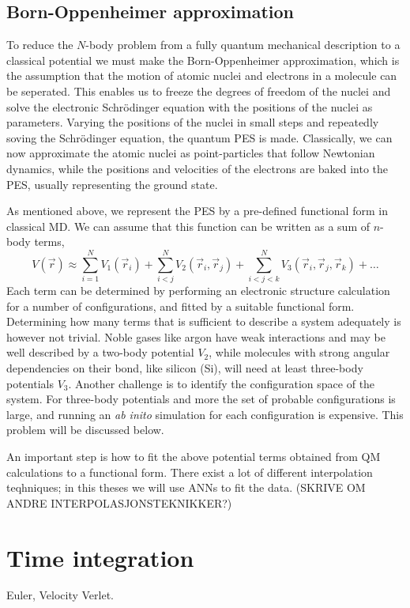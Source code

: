 \documentclass[twoside,english]{uiofysmaster}
\begin{document}
\subsection{Born-Oppenheimer approximation}
To reduce the $N$-body problem from a fully quantum mechanical description to a classical potential we must make the Born-Oppenheimer 
approximation, which is the assumption that the motion of atomic nuclei and electrons in a molecule
can be seperated. This enables us to freeze the degrees of freedom of the nuclei and solve the electronic
Schrödinger equation with the positions of the nuclei as parameters. Varying the positions of the nuclei
in small steps and repeatedly soving the Schrödinger equation, the quantum PES is made. 
Classically, we can now approximate the atomic nuclei as point-particles that follow
Newtonian dynamics, while the positions and velocities of the electrons are baked into the PES, usually
representing the ground state.

As mentioned above, we represent the PES by a pre-defined functional form in classical MD. We can assume that this
function can be written as a sum of $n$-body terms,
\begin{equation}
 V(\vec{r}) \approx \sum_{i=1}^N V_1(\vec{r}_i) + \sum_{i<j}^N V_2(\vec{r}_i, \vec{r}_j) + 
 \sum_{i<j<k}^N V_3(\vec{r}_i, \vec{r}_j, \vec{r}_k) + \dots
\end{equation}
Each term can be determined by performing an electronic structure calculation for a number of configurations, 
and fitted by a suitable functional form. Determining how many terms that is sufficient to 
describe a system adequately is however not trivial. Noble gases like argon have weak interactions and 
may be well described by a two-body potential $V_2$, while molecules with strong angular dependencies on their bond, like
silicon (Si), will need at least three-body potentials $V_3$. Another challenge is to identify the
configuration space of the system. For three-body potentials and more the set of probable configurations is large, and 
running an \textit{ab inito} simulation for each configuration is expensive. This problem will be discussed below. 

An important step is how to fit the above potential terms obtained from QM calculations to a functional form. 
There exist a lot of different interpolation teqhniques; in this theses we will use ANNs to fit the data. 
(SKRIVE OM ANDRE INTERPOLASJONSTEKNIKKER?)

\section{Time integration}
Euler, Velocity Verlet.
\end{document}
